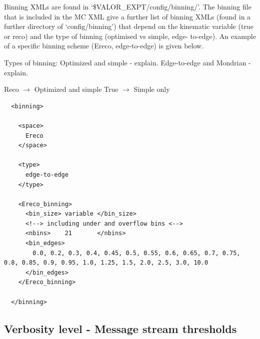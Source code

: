 Binning XMLs are found in `\$VALOR\_EXPT/config/binning/'. The binning file that is included in the MC XML give a further list of binning XMLs (found in a further directory of `config/binning') that depend on the kinematic variable (true or reco) and the type of binning (optimised vs simple, edge- to-edge). An example of a specific binning scheme (Ereco, edge-to-edge) is given below.

Types of binning: 
Optimized and simple - explain.
Edge-to-edge and Mondrian - explain.

Reco $\rightarrow$ Optimized and simple 
True $\rightarrow$ Simple only

{\color{capri}
\begin{verbatim}
  <binning>
    
    <space>
      Ereco
    </space>
  
    <type>
      edge-to-edge
    </type>
    
    <Ereco_binning>
      <bin_size> variable </bin_size>
      <!--> including under and overflow bins <-->
      <nbins>    21       </nbins>
      <bin_edges>
        0.0, 0.2, 0.3, 0.4, 0.45, 0.5, 0.55, 0.6, 0.65, 0.7, 0.75, 0.8, 0.85, 0.9, 0.95, 1.0, 1.25, 1.5, 2.0, 2.5, 3.0, 10.0
      </bin_edges>
    </Ereco_binning>
      
  </binning>
\end{verbatim}
}

\subsection{Verbosity level - Message stream thresholds}


